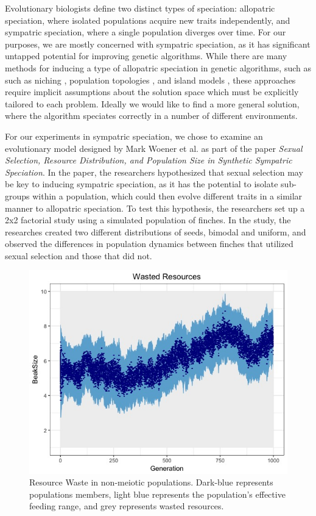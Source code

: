\documentclass[conference]{IEEEtran}
\begin{document}
Evolutionary biologists define two distinct types of speciation: allopatric speciation, where isolated populations acquire new traits independently, and sympatric speciation, where a single population diverges over time. For our purposes, we are mostly concerned with sympatric speciation, as it has significant untapped potential for improving genetic algorithms. While there are many methods for inducing a type of allopatric speciation in genetic algorithms, such as such as niching \cite{NICHING}, population topologies \cite{TOPOLOGIES}, and island models \cite{ISLAND}, these approaches require implicit assumptions about the solution space which must be explicitly tailored to each problem. Ideally we would like to find a more general solution, where the algorithm speciates correctly in a number of different environments. 

For our experiments in sympatric speciation, we chose to examine an evolutionary model designed by Mark Woener et al. as part of the paper \textit{Sexual Selection, Resource Distribution, and Population Size in Synthetic Sympatric Speciation}. In the paper, the researchers hypothesized that sexual selection may be key to inducing sympatric speciation, as it has the potential to isolate sub-groups within a population, which could then evolve different traits in a similar manner to allopatric speciation. To test this hypothesis, the researchers set up a 2x2 factorial study using a simulated population of finches. In the study, the researches created two different distributions of seeds, bimodal and uniform, and observed the differences in population dynamics between finches that utilized sexual selection and those that did not.

\begin{figure}[t]
    \centering
    \includegraphics[width=\linewidth]{Data/FrontPage}
    \caption{Resource Waste in non-meiotic populations. Dark-blue represents populations members, light blue represents the population's effective feeding range, and grey represents wasted resources.}
    \label{fig:FrontPage}
\end{figure}
\end{document}
